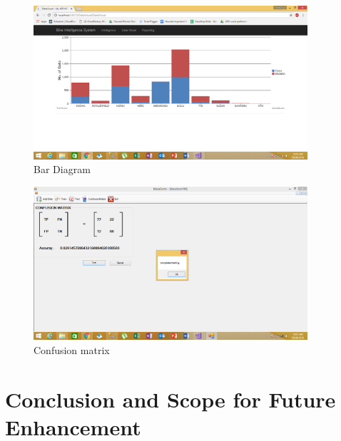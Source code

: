 \begin{figure}[tbh] %
\begin{center}
	\includegraphics[width=4in]{images/Screenshot4.png}
	\caption{Bar Diagram}  %
	\label{Output Preview} %
\end{center}
\end{figure}
\newpage
\begin{figure}[tbh] %
\begin{center}
	\includegraphics[width=4in]{images/Screenshot5.png}
	\caption{Confusion matrix}  %
	\label{Tesing Output Confusion Matrix} %
\end{center}
\end{figure}










\chapter{Conclusion and Scope for Future Enhancement}
